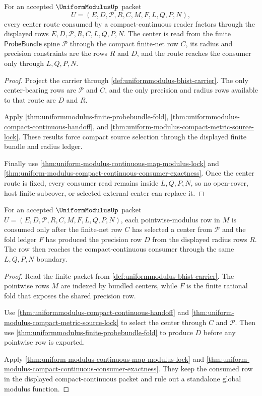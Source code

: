 \begin{theorem}
\label{thm:uniformmodulus-finite-net-center-route-exhaustion}
For an accepted $\UniformModulusUp$ packet
$$
U=(E,D,\mathcal{P},R,C,M,F,L,Q,P,N),
$$
every center route consumed by a compact-continuous reader factors through the displayed rows $E,D,\mathcal{P},R,C,L,Q,P,N$. The center is read from the finite $\mathsf{ProbeBundle}$ spine $\mathcal{P}$ through the compact finite-net row $C$, its radius and precision constraints are the rows $R$ and $D$, and the route reaches the consumer only through $L,Q,P,N$.
\end{theorem}
\begin{proof}
Project the carrier through \autoref{def:uniformmodulus-bhist-carrier}. The only center-bearing rows are $\mathcal{P}$ and $C$, and the only precision and radius rows available to that route are $D$ and $R$.

Apply \autoref{thm:uniformmodulus-finite-probebundle-fold}, \autoref{thm:uniformmodulus-compact-continuous-handoff}, and \autoref{thm:uniform-modulus-compact-metric-source-lock}. These results force compact source selection through the displayed finite bundle and radius ledger.

Finally use \autoref{thm:uniform-modulus-continuous-map-modulus-lock} and \autoref{thm:uniform-modulus-compact-continuous-consumer-exactness}. Once the center route is fixed, every consumer read remains inside $L,Q,P,N$, so no open-cover, host finite-subcover, or selected external center can replace it.
\end{proof}

\begin{theorem}
\label{thm:uniformmodulus-pointwise-modulus-row-consumption}
For an accepted $\UniformModulusUp$ packet $U=(E,D,\mathcal{P},R,C,M,F,L,Q,P,N)$, each pointwise-modulus row in $M$ is consumed only after the finite-net row $C$ has selected a center from $\mathcal{P}$ and the fold ledger $F$ has produced the precision row $D$ from the displayed radius rows $R$. The row then reaches the compact-continuous consumer through the same $L,Q,P,N$ boundary.
\end{theorem}
\begin{proof}
Read the finite packet from \autoref{def:uniformmodulus-bhist-carrier}. The pointwise rows $M$ are indexed by bundled centers, while $F$ is the finite rational fold that exposes the shared precision row.

Use \autoref{thm:uniformmodulus-compact-continuous-handoff} and \autoref{thm:uniform-modulus-compact-metric-source-lock} to select the center through $C$ and $\mathcal{P}$. Then use \autoref{thm:uniformmodulus-finite-probebundle-fold} to produce $D$ before any pointwise row is exported.

Apply \autoref{thm:uniform-modulus-continuous-map-modulus-lock} and \autoref{thm:uniform-modulus-compact-continuous-consumer-exactness}. They keep the consumed row in the displayed compact-continuous packet and rule out a standalone global modulus function.
\end{proof}

